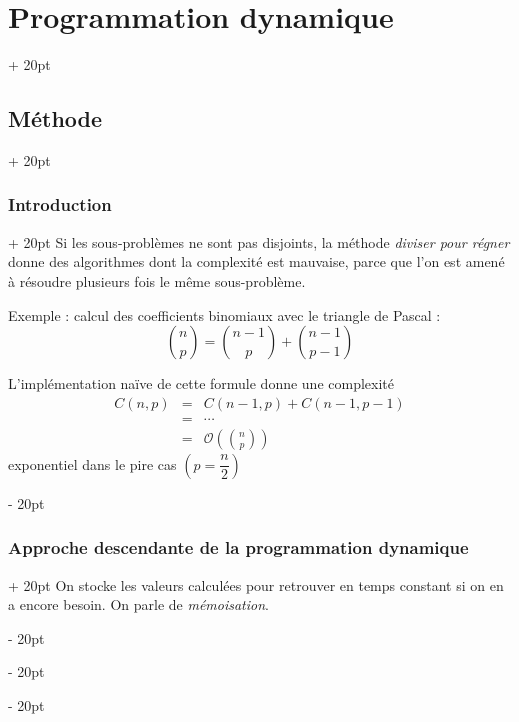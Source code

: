 \documentclass[a4paper, 12pt, twoside]{article}
\newcommand{\lr}[1]{\left( #1 \right)}
\newcommand{\ind}[1][20pt]{\advance\leftskip + #1}
\newcommand{\deind}[1][20pt]{\advance\leftskip - #1}
\newenvironment{indt}[2][20pt]{#2 \par \ind[#1]}{\par \deind} %
\begin{document}
    \begin{indt}{\section{Programmation dynamique}}
        
        \begin{indt}{\subsection{Méthode}}
            \begin{indt}{\subsubsection{Introduction}}
                Si les sous-problèmes ne sont pas disjoints, la méthode \textit{diviser pour régner} donne des algorithmes dont la complexité est mauvaise, parce que l'on est amené à résoudre plusieurs fois le même sous-problème.
                
                \vspace{6pt}
                
                Exemple : calcul des coefficients binomiaux avec le triangle de Pascal :
                    \[ \binom n p = \binom{n - 1}{p} + \binom{n - 1}{p - 1} \]
                
                L'implémentation naïve de cette formule donne une complexité
                    \[
                        \begin{array}{rcl}
                            C(n, p) &=& C(n - 1, p) + C(n - 1, p - 1)
                            \\
                            &=& \cdots
                            \\
                            &=& \displaystyle \mathcal O\lr{\binom n p}
                        \end{array}
                    \]
                exponentiel dans le pire cas $\lr{p = \dfrac n 2}$
            \end{indt}
            
            \vspace{12pt}
            
            \begin{indt}{\subsubsection{Approche descendante de la programmation dynamique}}
                On stocke les valeurs calculées pour retrouver en temps constant si on en a encore besoin. On parle de \textit{mémoisation}.
                

\end{indt}
\end{indt}
\end{indt}
\end{document}
